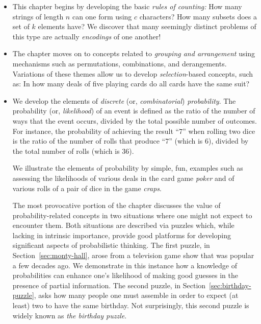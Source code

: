 \begin{itemize}
\item
This chapter begins by developing the basic {\em rules of counting:}  How many strings of length $n$ can one form using $c$ characters?  How many subsets does a set of $k$ elements have?  We discover that many seemingly distinct problems of this type are actually {\em encodings} of one another!

\medskip\item
The chapter moves on to concepts related to {\em grouping and arrangement} using mechanisms such as permutations, combinations, and derangements.  Variations of these themes allow us to develop {\em selection}-based concepts, such as: In how many deals of five playing cards do all cards have the same suit?

\medskip\item
We develop the elements of {\em discrete} (or, {\em combinatorial}) {\em probability}.  The probability (or, {\it likelihood}) of an event is defined as the ratio of the number of ways that the event occurs, divided by the total possible number of outcomes.  For instance, the probability of achieving the result ``$7$'' when rolling two dice is the ratio of the number of rolls that produce ``$7$'' (which is $6$), divided by the total number of rolls (which is $36$).

\smallskip

We illustrate the elements of probability by simple, fun, examples such as assessing the likelihoods of various deals in the card game {\it poker} and of various rolls of a pair of dice in the game {\it craps}.

\smallskip

The most provocative portion of the chapter discusses the value of probability-related concepts in two situations where one might not expect to encounter them.  Both situations are described via puzzles which, while lacking in intrinsic importance, provide good platforms for developing significant aspects of probabilistic thinking.  The first puzzle, in Section~\ref{sec:monty-hall}, arose from a television game show that was popular a few decades ago.  We demonstrate in this
instance how a knowledge of probabilities can enhance one's likelihood of making good guesses in the presence of partial information.  The second puzzle, in Section~\ref{sec:birthday-puzzle}, asks how many people one must assemble in order to expect (at least) two to have the same birthday. Not surprisingly, this second puzzle is widely known as {\it the birthday puzzle}.


\end{itemize}
